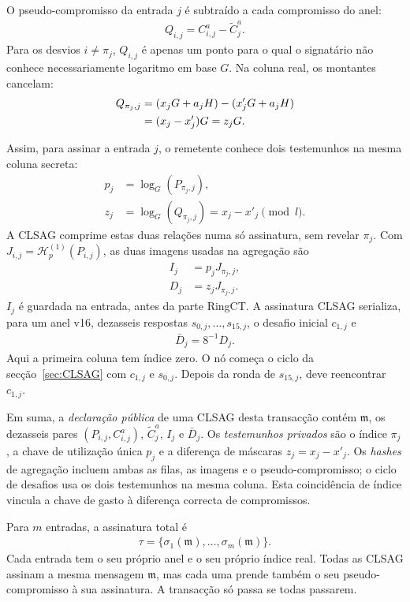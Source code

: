 O pseudo-compromisso da entrada \(j\) é subtraído a cada compromisso do
anel:
\begin{align*}
 Q_{i,j}=C^a_{i,j}-\widetilde C^a_j.
\end{align*}
Para os desvios \(i\ne\pi_j\), \(Q_{i,j}\) é apenas um ponto para o qual o
signatário não conhece necessariamente logaritmo em base \(G\). Na coluna
real, os montantes cancelam:
\begin{align}
 Q_{\pi_j,j}
 &=(x_jG+a_jH)-(x'_jG+a_jH)\notag\\
 &=(x_j-x'_j)G=z_jG.
 \label{eq:transaction-zero-commitment}
\end{align}

Assim, para assinar a entrada \(j\), o remetente conhece dois testemunhos na
mesma coluna secreta:
\begin{align*}
 p_j&=\log_G(P_{\pi_j,j}),\\
 z_j&=\log_G(Q_{\pi_j,j})=x_j-x'_j\pmod l.
\end{align*}
A CLSAG comprime estas duas relações numa só assinatura, sem revelar
\(\pi_j\). Com \(J_{i,j}=\mathcal H_p^{(1)}(P_{i,j})\), as duas
imagens usadas na agregação são
\begin{align*}
 I_j&=p_jJ_{\pi_j,j},\\
 D_j&=z_jJ_{\pi_j,j}.
\end{align*}
\(I_j\) é guardada na entrada, antes da parte RingCT. A assinatura CLSAG
serializa, para um anel v16, dezasseis respostas
\(s_{0,j},\ldots,s_{15,j}\), o desafio inicial \(c_{1,j}\) e
\begin{align*}
 \bar D_j=8^{-1}D_j.
\end{align*}
Aqui a primeira coluna tem índice zero. O nó começa o ciclo da
secção~\ref{sec:CLSAG} com \(c_{1,j}\) e \(s_{0,j}\). Depois da ronda
de \(s_{15,j}\), deve reencontrar \(c_{1,j}\).

Em suma, a \emph{declaração pública} de uma CLSAG desta transacção contém
\(\mathfrak m\), os dezasseis pares
\((P_{i,j},C^a_{i,j})\), \(\widetilde C^a_j\), \(I_j\) e \(\bar D_j\).
Os \emph{testemunhos privados} são o índice \(\pi_j\), a chave de utilização
única \(p_j\) e a diferença de máscaras \(z_j=x_j-x'_j\). Os \emph{hashes} de
agregação incluem ambas as filas, as imagens e o pseudo-compromisso; o ciclo
de desafios usa os dois testemunhos na mesma coluna. Esta coincidência de
índice vincula a chave de gasto à diferença correcta de compromissos.

Para \(m\) entradas, a assinatura total é
\begin{align*}
 \tau=\{\sigma_1(\mathfrak m),\ldots,\sigma_m(\mathfrak m)\}.
\end{align*}
Cada entrada tem o seu próprio anel e o seu próprio índice real. Todas as
CLSAG assinam a mesma mensagem \(\mathfrak m\), mas cada uma prende também o
seu pseudo-compromisso à sua assinatura. A transacção só passa se todas
passarem.


